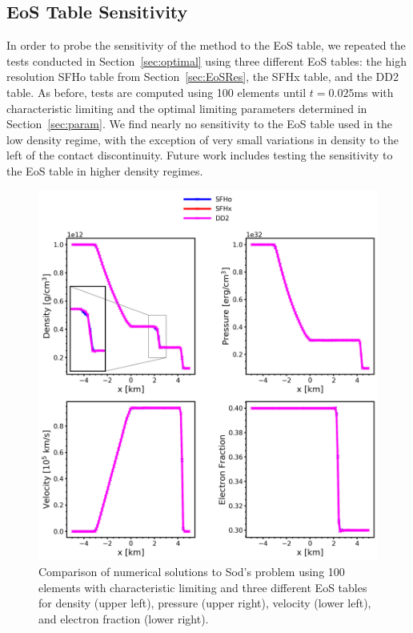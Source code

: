 \documentclass[onecolumn]{aastex62}
\begin{document}
\subsection{EoS Table Sensitivity}
In order to probe the sensitivity of the method to the EoS table, we repeated
the tests conducted in Section~\ref{sec:optimal} using three different EoS tables:
the high resolution SFHo table from Section~\ref{sec:EoSRes}, the SFHx table, and the DD2 table.
As before, tests are computed using 100 elements until
$t = 0.025$ms with characteristic limiting and the optimal limiting parameters determined in
Section~\ref{sec:param}. We find nearly no sensitivity to the EoS table used in
the low density regime, with the exception of very small variations in density
to the left of the contact discontinuity. Future work includes testing the
sensitivity to the EoS table in higher density regimes.
\begin{figure}[h!]
  \centering
  \includegraphics[width=36pc]{./figures/EoS_all.png}
  \caption{\label{fig:SodSedovEoS} Comparison of numerical solutions to
  Sod's problem using 100 elements with characteristic limiting and three
  different EoS tables for density (upper left), pressure (upper right),
  velocity (lower left), and electron fraction (lower right).
  }
\end{figure}
\FloatBarrier
\end{document}
